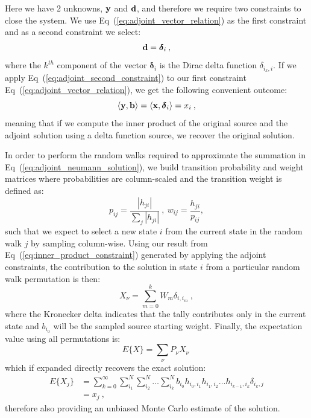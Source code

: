 \documentclass{mc2013}
\begin{document}
Here we have 2 unknowns, $\mathbf{y}$ and $\mathbf{d}$, and therefore we
require two constraints to close the system. We use
Eq~(\ref{eq:adjoint_vector_relation}) as the first constraint and as a
second constraint we select:
\begin{equation}
  \mathbf{d} = \boldsymbol{\delta}_i\:,
  \label{eq:adjoint_second_constraint}
\end{equation}
where the $k^{th}$ component of the vector $\boldsymbol{\delta}_i$ is
the Dirac delta function $\delta_{i_k,i}$. If we apply
Eq~(\ref{eq:adjoint_second_constraint}) to our first constraint
Eq~(\ref{eq:adjoint_vector_relation}), we get the following convenient
outcome:
\begin{equation}
  \langle \mathbf{y}, \mathbf{b} \rangle = \langle \mathbf{x},
  \boldsymbol{\delta}_i \rangle = x_i \:,
  \label{eq:inner_product_constraint}
\end{equation}
meaning that if we compute the inner product of the original source and
the adjoint solution using a delta function source, we recover the
original solution.

In order to perform the random walks required to approximate the
summation in Eq~(\ref{eq:adjoint_neumann_solution}), we build
transition probability and weight matrices where probabilities are
column-scaled and the transition weight is defined as:
\begin{equation}
  p_{ij} = \frac{|h_{ji}|}{\sum_j |h_{ji}|}\:,\ w_{ij} =
  \frac{h_{ji}}{p_{ij}},
  \label{eq:adjoint_probability}
\end{equation}
such that we expect to select a new state $i$ from the current state
in the random walk $j$ by sampling column-wise.  Using our result from
Eq~(\ref{eq:inner_product_constraint}) generated by applying the
adjoint constraints, the contribution to the solution in state $i$
from a particular random walk permutation is then:
\begin{equation}
  X_{\nu} = \sum_{m=0}^k W_{m} \delta_{i,i_m}\:,
  \label{eq:adjoint_permutation_contribution}
\end{equation}
where the Kronecker delta indicates that the tally contributes only in
the current state and $b_{i_0}$ will be the sampled source starting
weight. Finally, the expectation value using all permutations is:
\begin{equation}
  E\{X\} = \sum_{\nu} P_{\nu} X_{\nu}\:
  \label{eq:adjoint_expectation_value}
\end{equation}
which if expanded directly recovers the exact solution:
\begin{equation}
  \begin{split}
    E\{X_j\} &=\sum_{k=0}^{\infty}\sum_{i_1}^{N}\sum_{i_2}^{N}\ldots
    \sum_{i_k}^{N} b_{i_0} h_{i_0,i_1}h_{i_1,i_2}\ldots
    h_{i_{k-1},i_k} \delta_{i_k,j} \\ &= x_{j}\:,
  \end{split}
  \label{eq:adjoint_expectation_expansion}
\end{equation}
therefore also providing an unbiased Monte Carlo estimate of the
solution.
\end{document}
